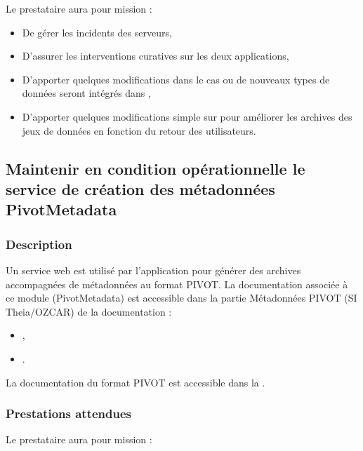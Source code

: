 \documentclass[]{article}
\newcommand{\mhref}[3][blue]{\href{#2}{\color{#1}{#3}}}%
\newcommand{\datasnot}{{\mhref{https://data-snot.cnrs.fr/}{data-snot}}}
\newcommand{\dataarchive}{{\mhref{https://data-snot.cnrs.fr/dataset-archive/}{dataset-archive}}}
\begin{document}
Le prestataire aura pour mission :

\begin{itemize}
	\item De gérer les incidents des serveurs,
	\item D'assurer les interventions curatives sur les deux applications,
	\item D'apporter quelques modifications dans le cas ou de nouveaux types de données seront intégrés dans \datasnot,
	\item D'apporter quelques modifications simple sur \dataarchive{} pour améliorer les archives des jeux de données en fonction du retour des utilisateurs.
\end{itemize}

\subsection{Maintenir en condition opérationnelle le service de création des métadonnées \og{}PivotMetadata\fg{}}

\subsubsection{Description}

Un service web est utilisé par l'application \dataarchive{} pour générer des archives accompagnées de métadonnées au format \og{}PIVOT\fg{}. La documentation associée à ce module (\og{}PivotMetadata\fg{}) est accessible dans la partie 
\og{}Métadonnées PIVOT (SI Theia/OZCAR)\fg{} de la documentation : 

\begin{itemize}
	\item \mhref{https://sourcesup.renater.fr/www/si-snot/5_Gestion_appliSOERE.html}{Présentation du module},
	\item \mhref{https://sourcesup.renater.fr/www/si-snot/5_Deploiement_MetadataPivot.html}{Déployer le module}.
\end{itemize}

La documentation du format \og{}PIVOT\fg{} est accessible dans la \mhref{https://theia-ozcar.gricad-pages.univ-grenoble-alpes.fr/doc-producer/producer-documentation.html}{documentation du SI Theia/OZCAR}.

\subsubsection{Prestations attendues}

Le prestataire aura pour mission :
\end{document}
